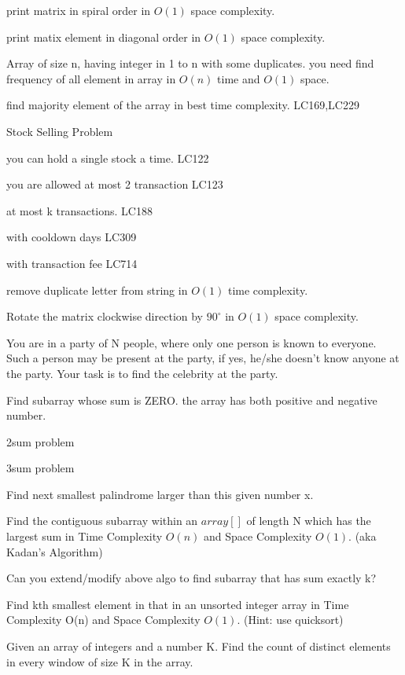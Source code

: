 {\begin{exercise}
\begin{compactenum}
    \item print matrix in spiral order in $O(1)$ space complexity.
    \item print matix element in diagonal order in $O(1)$ space complexity.
    \item Array of size n, having integer in 1 to n with some duplicates. you need find frequency of all element in array in $O(n)$ time and $O(1)$ space.
    \item find majority element of the array in best time complexity. LC169,LC229
    
    \item Stock Selling Problem
    \begin{compactenum}
        \item you can hold a single stock a time. LC122
        \item you are allowed at most 2 transaction LC123
        \item at most k transactions. LC188
        \item with cooldown days LC309
        \item with transaction fee LC714
    \end{compactenum}

\item remove duplicate letter from string in $O(1)$ time complexity.
\item Rotate the matrix clockwise direction by $90 ^\circ $ in $O(1)$ space complexity.
\item  You are in a party of N people, where only one person is known to everyone. Such a person may be present at the party, if yes, he/she doesn’t know anyone at the party. Your task is to find the celebrity at the party.
\item Find subarray whose sum is ZERO. the array has both positive and negative number.
\begin{compactenum}
    \item 2sum problem
    \item 3sum problem
\end{compactenum}
\item Find next smallest palindrome larger than this given number x.
\item Find the contiguous subarray within an $array[]$ of length N which has the largest sum in Time Complexity $O(n)$ and Space Complexity $O(1)$. (aka Kadan's Algorithm)
\begin{compactenum}
    \item Can you extend/modify above algo to find subarray that has sum exactly k?
\end{compactenum}
\item Find kth smallest element in that in an unsorted integer array in Time Complexity O(n) and Space Complexity $O(1)$. (Hint: use quicksort) 
\item Given an array of integers and a number K. Find the count of distinct elements in every window of size K in the array. 
    

\end{compactenum}
\end{exercise}}
